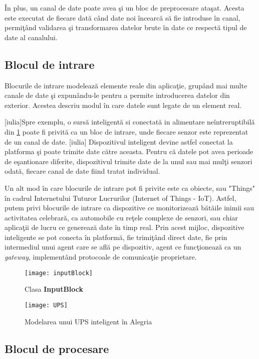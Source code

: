 În plus, un canal de date poate avea şi un bloc de preprocesare ataşat. Acesta este executat de fiecare dată când date noi încearcă să fie introduse în canal, permiţând validarea şi transformarea datelor brute în date ce respectă tipul de date al canalului.  
\subsection{Blocul de intrare}
Blocurile de intrare modelează elemente reale din aplicaţie, grupând mai multe canale de date şi expunându-le pentru a permite introducerea datelor din exterior. Acestea descriu modul în care datele sunt legate de un element real. 

[iulia]Spre exemplu, o sursă inteligentă si conectată in alimentare neîntreruptibilă din \cref{fig:ups} poate fi privită ca un bloc de intrare, unde fiecare senzor este reprezentat de un canal de date. [iulia] Dispozitivul inteligent devine astfel conectat la platforma şi poate trimite date către aceasta. Pentru că datele pot avea perioade de eşantionare diferite, dispozitivul trimite date de la unul sau mai mulţi senzori odată, fiecare canal de date fiind tratat individual.

Un alt mod în care blocurile de intrare pot fi privite este ca obiecte, sau "Things" în cadrul Internetului Tuturor Lucrurilor (Internet of Things - IoT). Astfel, putem privi blocurile de intrare ca dispozitive ce monitorizează bătăile inimii sau activitatea celebrară, ca automobile cu reţele complexe de senzori, sau chiar aplicaţii de lucru ce generează date în timp real. Prin acest mijloc, dispozitive inteligente se pot conecta în platformă, fie trimiţând direct date, fie prin intermediul unui agent care se află pe dispozitiv, agent ce funcţionează ca un \textit{gateway}, implementând protocoale de comunicaţie proprietare.

\begin{figure}[H]
	\centering
	\texttt{[image: inputBlock]}
	\caption{Clasa \textbf{InputBlock}}
\end{figure}
\begin{figure}[H]
	\centering
	\texttt{[image: UPS]}
	\caption{Modelarea unui UPS inteligent în Alegria}
	\label{fig:ups}
\end{figure}

\subsection{Blocul de procesare}

